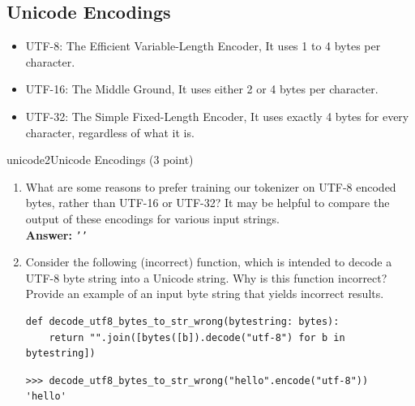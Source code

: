 \subsection{Unicode Encodings}

\begin{itemize}[itemsep=0pt, parsep=0pt, topsep=0pt]
    \item UTF-8: The Efficient Variable-Length Encoder, It uses 1 to 4 bytes per character.
    \item UTF-16: The Middle Ground, It uses either 2 or 4 bytes per character.
    \item UTF-32: The Simple Fixed-Length Encoder, It uses exactly 4 bytes for every character, regardless of what it is.
\end{itemize}

\begin{problembox}{unicode2}{Unicode Encodings (3 point)}

    \begin{enumerate}[label=(\alph*), itemsep=0.5em, topsep=0pt]

        \item What are some reasons to prefer training our tokenizer on UTF-8 encoded bytes, rather than UTF-16 or UTF-32? It may be helpful to compare the output of these encodings for various input strings.\\
              \textbf{Answer:} \texttt{''}

        \item Consider the following (incorrect) function, which is intended to decode a UTF-8 byte string into a Unicode string. Why is this function incorrect? Provide an example of an input byte string that yields incorrect results. \\
              \vspace{-1.5em}
              \begin{verbatim}
def decode_utf8_bytes_to_str_wrong(bytestring: bytes): 
    return "".join([bytes([b]).decode("utf-8") for b in bytestring])
\end{verbatim}

              \vspace{-1em}

              \begin{verbatim}
>>> decode_utf8_bytes_to_str_wrong("hello".encode("utf-8"))
'hello'
\end{verbatim}


\end{enumerate}
\end{problembox}
